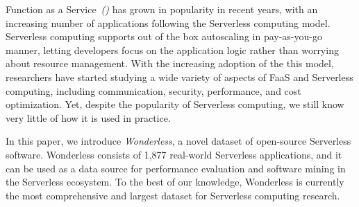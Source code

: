 %
%
Function as a Service~\emph{(\faas)} has grown in popularity in recent years, 
with an increasing number of applications following the Serverless computing model. 
Serverless computing supports out of the box autoscaling in pay-as-you-go manner, 
letting developers focus on the application logic rather than worrying 
about resource management. 
%
With the increasing adoption of the this model, researchers have started 
studying a wide variety of aspects of FaaS and Serverless computing, 
including communication, security, performance, and cost optimization. 
Yet, despite the popularity of Serverless computing, we still know very little of how it 
is used in practice.

In this paper, we introduce \emph{Wonderless}, a novel dataset
of open-source Serverless software. 
Wonderless consists of 1,877 real-world Serverless applications, 
and it can be used as a data source for performance evaluation and 
software mining in the Serverless ecosystem. To the best of our knowledge, 
Wonderless is currently the most comprehensive and largest dataset
for Serverless computing research.


